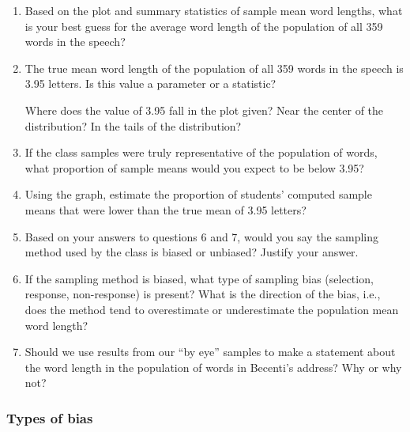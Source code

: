 \documentclass[
]{report}
\begin{document}
\begin{enumerate}
\def\labelenumi{\arabic{enumi}.}
\setcounter{enumi}{3}
\item
  Based on the plot and summary statistics of sample mean word lengths, what is your best guess for the average word length of the population of all 359 words in the speech?
  \vspace{0.3in}
\item
  The true mean word length of the population of all 359 words in the speech is 3.95 letters. Is this value a parameter or a statistic?\\
  \vspace{0.2in}

  Where does the value of 3.95 fall in the plot given? Near the center of the distribution? In the tails of the distribution?
  \vspace{0.3in}
\item
  If the class samples were truly representative of the population of words, what proportion of sample means would you expect to be below 3.95?
  \vspace{0.5in}
\item
  Using the graph, estimate the proportion of students' computed sample means that were lower than the true mean of 3.95 letters?
  \vspace{0.5in}
\item
  Based on your answers to questions 6 and 7, would you say the sampling method used by the class is biased or unbiased? Justify your answer.\\
  \vspace{0.5in}
\item
  If the sampling method is biased, what type of sampling bias (selection, response, non-response) is present? What is the direction of the bias, i.e., does the method tend to overestimate or underestimate the population mean word length?
  \vspace{0.5in}
\item
  Should we use results from our ``by eye'' samples to make a statement about the word length in the population of words in Becenti's address? Why or why not?
  \vspace{0.6in}
\end{enumerate}

\newpage

\hypertarget{types-of-bias}{%
\subsubsection*{Types of bias}\label{types-of-bias}}
\end{document}
